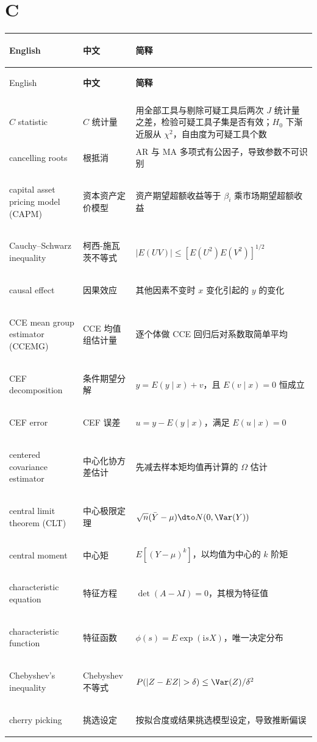 \section*{C}
\begin{longtable}{@{}>{\bfseries\boldmath\raggedright\arraybackslash}p{4.6cm}>{\raggedright\arraybackslash}p{3.2cm}>{\raggedright\arraybackslash}p{\dimexpr\textwidth-7.8cm-4\tabcolsep\relax}@{}}
\toprule
English & \textbf{中文} & \textbf{简释}\\
\midrule
\endfirsthead
\toprule
English & \textbf{中文} & \textbf{简释}\\
\midrule
\endhead
\midrule
\multicolumn{3}{r@{}}{\footnotesize\itshape （续下页）}\\
\endfoot
\bottomrule
\endlastfoot
$C$ statistic & $C$ 统计量 & 用全部工具与剔除可疑工具后两次 $J$ 统计量之差，检验可疑工具子集是否有效；$H_0$ 下渐近服从 $\chi^2$，自由度为可疑工具个数 \\
cancelling roots & 根抵消 & AR 与 MA 多项式有公因子，导致参数不可识别 \\
capital asset pricing model (CAPM) & 资本资产定价模型 & 资产期望超额收益等于 $\beta_i$ 乘市场期望超额收益 \\
Cauchy--Schwarz inequality & 柯西-施瓦茨不等式 & $|E(UV)|\le[E(U^2)E(V^2)]^{1/2}$ \\
causal effect & 因果效应 & 其他因素不变时 $x$ 变化引起的 $y$ 的变化 \\
CCE mean group estimator (CCEMG) & CCE 均值组估计量 & 逐个体做 CCE 回归后对系数取简单平均 \\
CEF decomposition & 条件期望分解 & $y=E(y\mid x)+v$，且 $E(v\mid x)=0$ 恒成立 \\
CEF error & CEF 误差 & $u=y-E(y\mid x)$，满足 $E(u\mid x)=0$ \\
centered covariance estimator & 中心化协方差估计 & 先减去样本矩均值再计算的 $\Omega$ 估计 \\
central limit theorem (CLT) & 中心极限定理 & $\sqrt n(\bar Y-\mu)\dto N(0,\Var(Y))$ \\
central moment & 中心矩 & $E[(Y-\mu)^k]$，以均值为中心的 $k$ 阶矩 \\
characteristic equation & 特征方程 & $\det(A-\lambda I)=0$，其根为特征值 \\
characteristic function & 特征函数 & $\phi(s)=E\exp(\mathrm{i}sX)$，唯一决定分布 \\
Chebyshev's inequality & Chebyshev 不等式 & $P(|Z-EZ|>\delta)\le\Var(Z)/\delta^2$ \\
cherry picking & 挑选设定 & 按拟合度或结果挑选模型设定，导致推断偏误 \\

\end{longtable}
